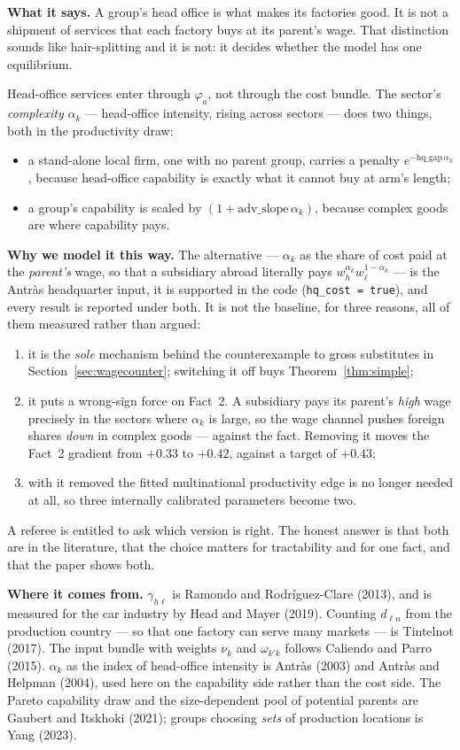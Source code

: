 \documentclass[11pt]{article}
\newcommand{\says}[1]{\smallskip\noindent\textbf{What it says.} #1\smallskip}
\newcommand{\why}[1]{\smallskip\noindent\textbf{Why we model it this way.} #1\smallskip}
\newcommand{\from}[1]{\smallskip\noindent\textbf{Where it comes from.} #1\smallskip}
\theoremstyle{plain}
\theoremstyle{remark}
\theoremstyle{definition}
\begin{document}
\says{A group's head office is what makes its factories good. It is not a shipment of
services that each factory buys at its parent's wage. That distinction sounds like
hair-splitting and it is not: it decides whether the model has one equilibrium.}

Head-office services enter through $\varphi_a$, not through the cost bundle. The
sector's \emph{complexity} $\alpha_k$ --- head-office intensity, rising across
sectors --- does two things, both in the productivity draw:
\begin{itemize}
\item a stand-alone local firm, one with no parent group, carries a penalty
$e^{-\text{hq\_gap}\,\alpha_k}$, because head-office capability is exactly what it
cannot buy at arm's length;
\item a group's capability is scaled by $(1+\text{adv\_slope}\,\alpha_k)$, because
complex goods are where capability pays.
\end{itemize}

\why{The alternative --- $\alpha_k$ as the share of cost paid at the \emph{parent's}
wage, so that a subsidiary abroad literally pays $w_h^{\alpha_k}w_\ell^{1-\alpha_k}$
--- is the Antr\`as headquarter input, it is supported in the code
(\texttt{hq\_cost = true}), and every result is reported under both. It is not the
baseline, for three reasons, all of them measured rather than argued:
\begin{enumerate}
\item it is the \emph{sole} mechanism behind the counterexample to gross substitutes
in Section~\ref{sec:wagecounter}; switching it off buys Theorem~\ref{thm:simple};
\item it puts a wrong-sign force on Fact~2. A subsidiary pays its parent's \emph{high}
wage precisely in the sectors where $\alpha_k$ is large, so the wage channel pushes
foreign shares \emph{down} in complex goods --- against the fact. Removing it moves the
Fact~2 gradient from $+0.33$ to $+0.42$, against a target of $+0.43$;
\item with it removed the fitted multinational productivity edge is no longer needed at
all, so three internally calibrated parameters become two.
\end{enumerate}
A referee is entitled to ask which version is right. The honest answer is that both
are in the literature, that the choice matters for tractability and for one fact, and
that the paper shows both.}

\from{$\gamma_{h\ell}$ is Ramondo and Rodr\'iguez-Clare (2013), and is measured for the
car industry by Head and Mayer (2019). Counting $d_{\ell n}$ from the production
country --- so that one factory can serve many markets --- is Tintelnot (2017). The
input bundle with weights $\nu_k$ and $\omega_{k'k}$ follows Caliendo and Parro (2015).
$\alpha_k$ as the index of head-office intensity is Antr\`as (2003) and Antr\`as and
Helpman (2004), used here on the capability side rather than the cost side. The Pareto
capability draw and the size-dependent pool of potential parents are Gaubert and
Itskhoki (2021); groups choosing \emph{sets} of production locations is Yang (2023).}
\end{document}

